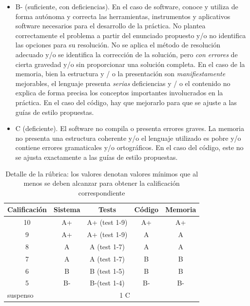 \documentclass{unizarpractice}
\begin{document}
\begin{itemize}[topsep=-0.5\baselineskip]
\item B- (suficiente, con deficiencias). En el caso de software, conoce y utiliza de forma autónoma y correcta las herramientas, instrumentos y aplicativos software necesarios para el desarrollo de la práctica. No plantea correctamente el problema a partir del enunciado propuesto y/o no identifica las opciones para su resolución. No se aplica el método de resolución adecuado y/o se identifica la corrección de la solución, pero \emph{con errores} de cierta gravedad y/o sin proporcionar una solución completa. 
En el caso de la memoria, bien
la estructura y / o la presentación son \emph{manifiestamente} mejorables, el lenguaje presenta \emph{serias} deficiencias y / o el contenido no explica de forma precisa los conceptos importantes involucrados en la práctica.
En el caso del código, hay que mejorarlo para que se ajuste a las guías de estilo propuestas.

\item C (deficiente). El software no compila o presenta errores graves. La memoria no presenta una estructura coherente y/o el lenguaje utilizado es pobre y/o contiene errores gramaticales y/o ortográficos. En el caso del código, este no se ajusta exactamente a las guías de estilo propuestas.
\end{itemize}

\begin{table}[h]
\centering
\begin{tabular}{|c|c|c|c|c|}
\hline
Calificación                   & Sistema & Tests & Código & Memoria \\ \hline
10                             & A+        & A+ (test 1-9)      & A+                          & A+                           \\ \hline
9                              & A+        & A+ (test 1-9)      & A                           & A                            \\ \hline
8                              & A        & A  (test 1-7)     & A                           & A                            \\ \hline
7                              & A         & A (test 1-7)       & B                           & B                            \\ \hline
6                              & B         & B (test 1-5)       & B                           & B                            \\ \hline
5                              & B-         & B-(test 1-4)        & B-                          & B-                           \\ \hline
\multicolumn{1}{|l|}{suspenso} & \multicolumn{4}{c|}{1 C}                                                          \\ \hline
\end{tabular}
\caption{Detalle de la rúbrica: los valores denotan valores mínimos que al menos se deben alcanzar para obtener la calificación correspondiente}
\label{rubrica}
\end{table}
\end{document}
